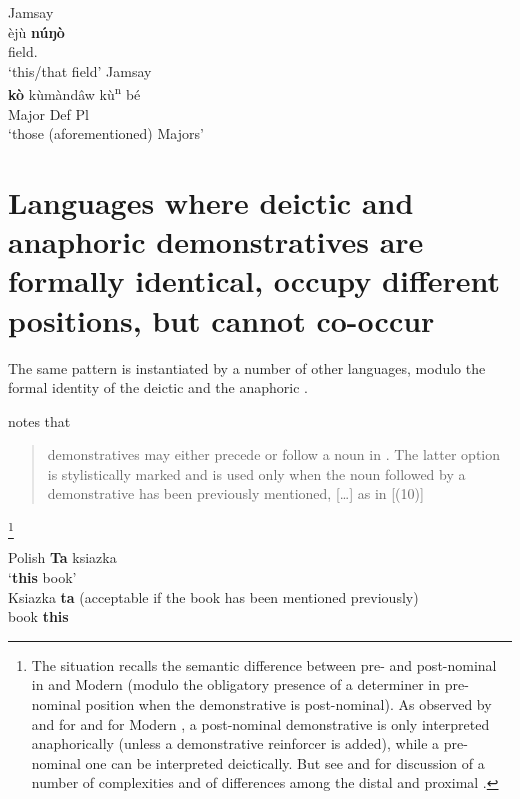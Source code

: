 \documentclass[output=paper]{langsci/langscibook}
\begin{document}
\ea\label{ex:key:09.9}
	\ea Jamsay \parencite[161]{Heath2008}\\
		\gll èjù  \textbf{núŋò}\\
                field.\Ll{} \textbf{\Dem{}}\\
		\glt ‘this/that field’
	\ex Jamsay \parencite[164]{Heath2008}\\
		\gll \textbf{kò}  kùmàndâw kù\textsuperscript{n} bé\\
			    \textbf{\Dem{}} Major Def Pl\\
		\glt ‘those (aforementioned) Majors’
	\z
\z

\section{Languages where deictic and anaphoric demonstratives are formally
identical, occupy different positions, but cannot co-occur}

The same pattern is instantiated by a number of other languages, modulo the
formal identity of the deictic and the anaphoric .

\textcite[142]{Migdalski2001} notes that \blockquote{demonstratives may either
    precede or follow a noun in . The latter option is
    stylistically marked and is used only when the noun followed by a
    demonstrative has been previously mentioned, [\dots{}] as in
    [(10)]}:\footnote{The  situation recalls the semantic difference
    between pre- and post-nominal  in  and Modern
    (modulo the obligatory presence of a determiner in pre-nominal position
    when the demonstrative is post-nominal). As observed by
    \citet{Bernstein1997} and \citet{Taboada2007} for  and
    \citet{Panagiotidis2000} for Modern , a post-nominal
    demonstrative is only interpreted anaphorically (unless a demonstrative
    reinforcer is added), while a pre-nominal one can be interpreted
    deictically. But see \textcite[50, n.\ 27]{Bruge2002} and \textcite[§2.5.3,
p.\ 167, n.\ 51]{Bruge2000} for discussion of a number of complexities and of
differences among the  distal and proximal .}

\ea Polish\label{ex:key:09.10}
	\ea
		\textbf{Ta} ksiazka\\
		‘\textbf{this} book’\\
	\ex
		\gll Ksiazka \textbf{ta} (acceptable if the book has been mentioned previously)\\
			book \textbf{this}\\
	\z
\z
\end{document}
